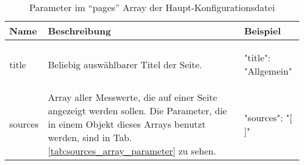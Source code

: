 \begin{enumerate}
	\begin{table}[H]
		\caption{Parameter im \enquote{pages} Array der Haupt-Konfigurationsdatei}
		\label{tab:pages_array_parameter}
			\begin{tabular}{p{} p{} | p{}}
			\toprule
			\textbf{Name} & \textbf{Beschreibung} & \textbf{Beispiel} \\
			\midrule
			title      	& Beliebig auswählbarer Titel der Seite. & 
			\begin{jsonTable}
"title": "Allgemein"
			\end{jsonTable} 
			\\
			sources 	& Array aller Messwerte, die auf einer Seite angezeigt werden sollen. Die Parameter, die in einem Objekt dieses Arrays benutzt werden, sind in Tab. \ref{tab:sources_array_parameter} zu sehen. & 
			\begin{jsonTable}
"sources": "[ ]"
			\end{jsonTable} 
			\\
			\bottomrule
		\end{tabular}
	\end{table}
	

\end{enumerate}
